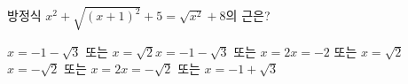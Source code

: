 방정식 $x^2+\sqrt{(x+1)^2}+5=\sqrt{x^2}+8$의 근은?
\begin{choicesv}{$x=-1-\sqrt{3}$ 또는 $x=\sqrt{2}$}{$x=-1-\sqrt{3}$ 또는 $x=2$}{$x=-2$ 또는 $x=\sqrt{2}$}{$x=-\sqrt{2}$ 또는 $x=2$}{$x=-\sqrt{2}$ 또는 $x=-1+\sqrt{3}$}\end{choicesv}
